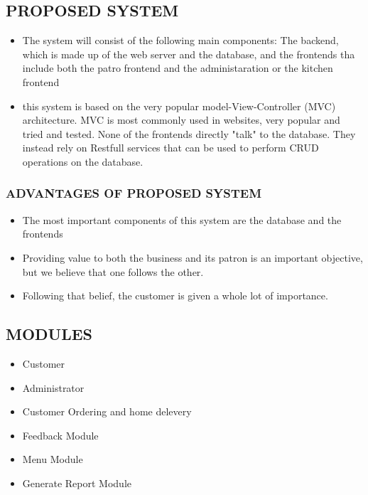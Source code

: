\documentclass[12pt,a4paper]{article}
\begin{document}
	\subsection{PROPOSED SYSTEM}
	\begin{itemize}
		\item The system will consist of the following main components: The backend, which is made up of the web server and the database, and the frontends tha include both the patro frontend and the administaration or the kitchen frontend 
		\item this system is based on the very popular model-View-Controller (MVC) architecture. MVC is most commonly used in websites, very popular and tried and tested. None of the frontends directly "talk" to the database. They instead rely on Restfull services that can be used to perform CRUD operations on the database.
	\end{itemize}
		
		\subsubsection{ADVANTAGES OF PROPOSED SYSTEM}
		\begin{itemize}
			\item The most important components of this system are the database and the frontends
			\item Providing value to both the business and its patron is an important objective, but we believe that one follows the other.
		\item Following that belief, the customer is given a whole lot of importance.
		\end{itemize}
		
	\subsection{MODULES}
		\begin{itemize}
			\item Customer
			\item Administrator
			\item Customer Ordering and home delevery
			\item Feedback Module
			\item Menu Module
			\item Generate Report Module
		\end{itemize}
\end{document}
